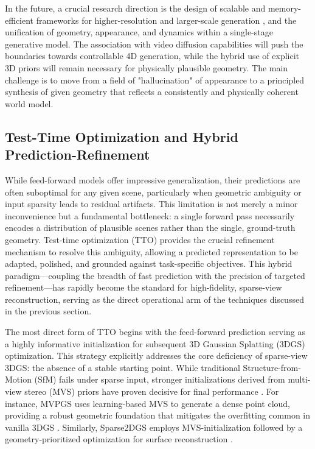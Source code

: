 \documentclass[11pt,a4paper]{article}
\begin{document}
In the future, a crucial research direction is the design of scalable and memory-efficient frameworks for higher-resolution and larger-scale generation \cite{arxiv:2506.02751v3}, and the unification of geometry, appearance, and dynamics within a single-stage generative model. The association with video diffusion capabilities will push the boundaries towards controllable 4D generation, while the hybrid use of explicit 3D priors will remain necessary for physically plausible geometry. The main challenge is to move from a field of "hallucination" of appearance to a principled synthesis of given geometry that reflects a consistently and physically coherent world model.


\subsection{Test-Time Optimization and Hybrid Prediction-Refinement}


While feed-forward models offer impressive generalization, their predictions are often suboptimal for any given scene, particularly when geometric ambiguity or input sparsity leads to residual artifacts. This limitation is not merely a minor inconvenience but a fundamental bottleneck: a single forward pass necessarily encodes a distribution of plausible scenes rather than the single, ground-truth geometry. Test-time optimization (TTO) provides the crucial refinement mechanism to resolve this ambiguity, allowing a predicted representation to be adapted, polished, and grounded against task-specific objectives. This hybrid paradigm---coupling the breadth of fast prediction with the precision of targeted refinement---has rapidly become the standard for high-fidelity, sparse-view reconstruction, serving as the direct operational arm of the techniques discussed in the previous section.

The most direct form of TTO begins with the feed-forward prediction serving as a highly informative initialization for subsequent 3D Gaussian Splatting (3DGS) optimization. This strategy explicitly addresses the core deficiency of sparse-view 3DGS: the absence of a stable starting point. While traditional Structure-from-Motion (SfM) fails under sparse input, stronger initializations derived from multi-view stereo (MVS) priors have proven decisive for final performance \cite{arxiv:2506.13508v1,arxiv:2510.17479v1}. For instance, MVPGS uses learning-based MVS to generate a dense point cloud, providing a robust geometric foundation that mitigates the overfitting common in vanilla 3DGS \cite{arxiv:2409.14316v1}. Similarly, Sparse2DGS employs MVS-initialization followed by a geometry-prioritized optimization for surface reconstruction \cite{arxiv:2504.20378v1}.
\end{document}
